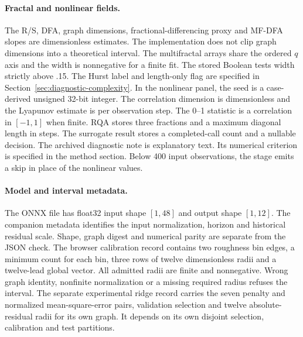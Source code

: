\paragraph{Fractal and nonlinear fields.}
The R/S, DFA, graph dimensions, fractional-differencing proxy and
MF-DFA slopes are dimensionless estimates. The implementation
does not clip graph dimensions into a theoretical interval.
The multifractal arrays share the ordered $q$ axis and the width
is nonnegative for a finite fit. The stored Boolean tests width
strictly above .15. The Hurst label and length-only flag are
specified in Section~\ref{sec:diagnostic-complexity}. In the
nonlinear panel, the seed is a case-derived unsigned 32-bit
integer. The correlation dimension is dimensionless and the
Lyapunov estimate is per observation step. The 0--1 statistic is a
correlation in $[-1,1]$ when finite. RQA stores three fractions
and a maximum diagonal length in steps. The surrogate result
stores a completed-call count and a nullable decision. The
archived diagnostic note is explanatory text. Its numerical
criterion is specified in the method section. Below 400 input
observations, the stage emits a skip in place of the nonlinear
values.

\paragraph{Model and interval metadata.}
The ONNX file has float32 input shape $[1,48]$ and output shape $[1,12]$. The companion metadata identifies the input normalization, horizon and historical residual scale. Shape, graph digest and numerical parity are separate from the JSON check. The browser calibration record contains two roughness bin edges, a minimum count for each bin, three rows of twelve dimensionless radii and a twelve-lead global vector. All admitted radii are finite and nonnegative. Wrong graph identity, nonfinite normalization or a missing required radius refuses the interval. The separate experimental ridge record carries the seven penalty and normalized mean-square-error pairs, validation selection and twelve absolute-residual radii for its own graph. It depends on its own disjoint selection, calibration and test partitions.

